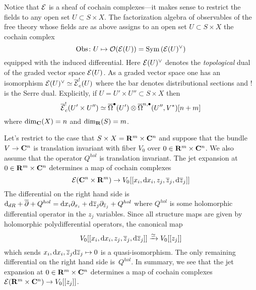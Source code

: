 Notice that $\mathcal E$ is a sheaf of cochain complexes---it makes sense to restrict the fields to any open set $U \subset S \times X$. 
The factorization algebra of observables of the free theory whose fields are as above assigns to an open set $U \subset S \times X$ the cochain complex
\[
\operatorname{Obs} \colon U \mapsto \mathcal O(\mathcal E(U)) = \operatorname{Sym} \left(\mathcal E(U)^\vee \right) 
\]
equipped with the induced differential.
Here $\mathcal E(U)^\vee$ denotes the {\em topological} dual of the graded vector space $\mathcal E(U)$. 
As a graded vector space one has an isomorphism $\mathcal E(U)^\vee \simeq \overline{\mathcal E}^!_c(U)$ where the bar denotes distributional sections and $!$ is the Serre dual. 
Explicitly, if $U = U' \times U'' \subset S \times X$ then 
\[
\overline{\mathcal E}^!_c(U' \times U'') \simeq \overline{\Omega}^\bullet(U') \otimes \overline{\Omega}^{n,\bullet}(U'',V^*)[n+m] 
\]
where $\dim_{\mathbf{C}} (X) = n$ and $\dim_{\mathbf{R}} (S) = m$. 

Let's restrict to the case that $S \times X = \mathbf{R}^m \times \mathbf{C}^n$ and suppose that the bundle $V \to \mathbf{C}^n$ is translation invariant with fiber $V_0$ over $0 \in \mathbf{R}^m \times \mathbf{C}^n$.
We also assume that the operator $Q^{hol}$ is translation invariant. 
The jet expansion at $0 \in \mathbf{R}^m \times \mathbf{C}^n$ determines a map of cochain complexes
\[
\mathcal E(\mathbf{C}^n \times \mathbf{R}^m) \to V_0 [[x_i, {\rm d} x_i,z_j, \overline{z}_j, {\rm d} \overline{z}_j]] 
\]
The differential on the right hand side is ${\rm d}_{dR} + \overline{\partial} + Q^{hol} = {\rm d} x_i \partial_{x_i} + {\rm d} \overline{z}_j \partial_{\overline{z}_j} + Q^{hol}$ where $Q^{hol}$ is some holomorphic differential operator in the $z_j$ variables. 
Since all structure maps are given by holomorphic polydifferential operators, the canonical map 
\[
V_0 [[x_i, {\rm d} x_i,z_j, \overline{z}_j, {\rm d} \overline{z}_j]] \xrightarrow{\simeq} V_0 [[z_j]] 
\]
which sends $x_i, {\rm d} x_i,\overline{z}_j {\rm d} \overline{z}_j \mapsto 0$ is a quasi-isomorphism. 
The only remaining differential on the right hand side is~$Q^{hol}$. 
In summary, we see that the jet expansion at $0 \in \mathbf{R}^m \times \mathbf{C}^n$ determines a map of cochain complexes $\mathcal E(\mathbf{R}^m \times \mathbf{C}^n) \to V_0[[z_j]]$. 

